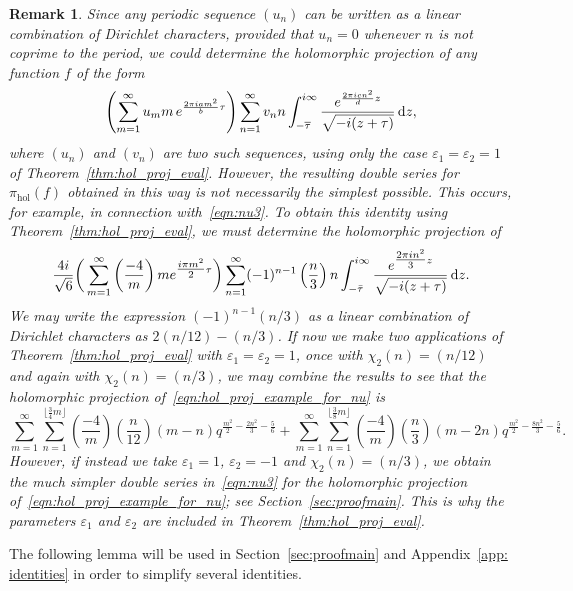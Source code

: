 \documentclass[11pt,reqno]{amsart}
\renewcommand{\=}{\;=\;}
\theoremstyle{myremark}
\newtheorem{remark}{Remark}
\newcommand{\dd}{\mathrm{d}}
\begin{document}
\begin{remark}
Since any periodic sequence $(u_n)$ can be written as a linear combination of Dirichlet characters, provided that $u_n=0$ whenever $n$ is not coprime to the period, we could determine the holomorphic projection of any function $f$ of the form
\[ 
\left( \sum_{m=1}^\infty u_m m \, e^{{2\pi i a m^2 \over b} \tau} \right) \sum_{n=1}^\infty v_n n \int_{-\overline{\tau}}^{i \infty} {e^{{2\pi i c n^2 \over d}z} \over \sqrt{-i(z+\tau)}} \, \dd z, 
\]
where $(u_n)$ and $(v_n)$ are two such sequences, using only the case $\varepsilon_1=\varepsilon_2=1$ of Theorem~\ref{thm:hol_proj_eval}. 
However, the resulting double series for $\pi_\text{hol}(f)$ obtained in this way is not necessarily the simplest possible. 
This occurs, for example, in connection with~\eqref{eqn:nu3}. To obtain this identity using Theorem~\ref{thm:hol_proj_eval}, we must determine the holomorphic projection of
\begin{equation} \label{eqn:hol_proj_example_for_nu}
{4i \over \sqrt{6}}\bigg( \sum_{m=1}^\infty \left({-4 \over m}\right) m e^{\tfrac{i\pi m^2 }{2}\tau} \bigg) \sum_{n=1}^\infty (-1)^{n-1} \left({n \over 3}\right) n \int_{-\bar{\tau}}^{i\infty} {e^{\tfrac{2\pi i n^2 }{3}z} \over \sqrt{-i(z+\tau)}} \, \dd z.
\end{equation}
We may write the expression $(-1)^{n-1} (n/3)$ as a linear combination of Dirichlet characters as $2(n/12) - (n/3)$. 
If now we make two applications of Theorem~\ref{thm:hol_proj_eval} with $\varepsilon_1=\varepsilon_2=1$, once with $\chi_2(n) = (n/12)$ and again with $\chi_2(n) = (n/3)$, we may combine the results to see that the holomorphic projection of~\eqref{eqn:hol_proj_example_for_nu} is
\[ \sum_{m=1}^\infty\sum_{n=1}^{\lfloor \frac{3}{4}m \rfloor} \left(\frac{-4}{m}\right)\left(\frac{n}{12}\right)\left(m-n\right)q^{\frac{m^2}{2}-\frac{2n^2}{3}-\frac{5}{6}} +\sum_{m=1}^\infty\sum_{n=1}^{\lfloor \frac{3}{8}m \rfloor} \left(\frac{-4}{m}\right)\left(\frac{n}{3}\right)\left(m-2n\right)q^{\frac{m^2}{2}-\frac{8n^2}{3}-\frac{5}{6}}. \]
However, if instead we take $\varepsilon_1=1$, $\varepsilon_2=-1$ and $\chi_2(n) = (n/3)$, we obtain the much simpler double series in~\eqref{eqn:nu3} for the holomorphic projection of~\eqref{eqn:hol_proj_example_for_nu}; see Section~\ref{sec:proofmain}. 
This is why the parameters $\varepsilon_1$ and $\varepsilon_2$ are included in Theorem~\ref{thm:hol_proj_eval}.
\end{remark}

The following lemma will be used in Section~\ref{sec:proofmain} and Appendix~\ref{app: identities} in order to simplify several identities.
\end{document}
